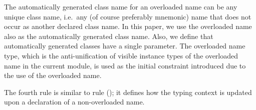 The automatically generated class name for an overloaded name can be
any unique class name, i.e.~any (of course preferably mnemonic) name
that does not occur as another declared class name. In this paper, we
use the overloaded name also as the automatically generated class
name. Also, we define that automatically generated classes have a
single parameter. The overloaded name type, which is the
anti-unification of visible instance types of the overloaded name in
the current module, is used as the initial constraint introduced due
to the use of the overloaded name. 

The fourth rule is similar to rule (\LET); it defines how the typing
context is updated upon a declaration of a non-overloaded name.





%
%
